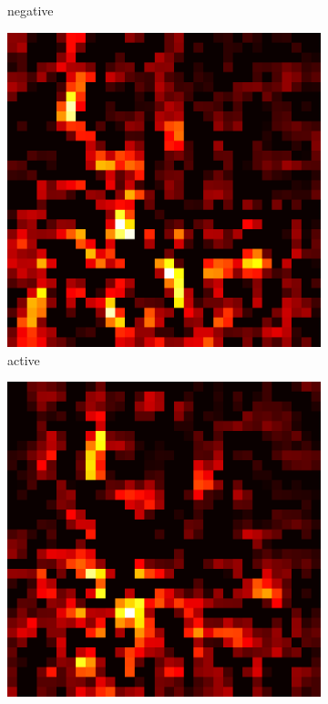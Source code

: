 \documentclass[preprint,12pt]{elsarticle}
\begin{document}
\begin{figure}
\begin{subfigure}{0.14\textwidth}
        \caption{negative}
    \end{subfigure}
    \hfill
    \begin{subfigure}{0.14\textwidth}
        \centering
        \includegraphics[width=\linewidth]{../visualizations/examples/cifar10/cnn/active_saliency_map/8.png}
        \caption{active}
    \end{subfigure}
    \hfill
    \begin{subfigure}{0.14\textwidth}
        \centering
        \includegraphics[width=\linewidth]{../visualizations/examples/cifar10/cnn/inactive_saliency_map/8.png}

\end{subfigure}
\end{figure}
\end{document}
